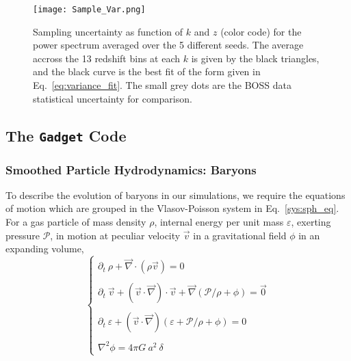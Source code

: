 \begin{figure}
\begin{center}
\texttt{[image: Sample\_Var.png]}
\caption{Sampling uncertainty as function of $k$ and $z$ (color code) for the power spectrum averaged over the 5 different seeds. The average accross the 13 redshift bins at each $k$ is given by the black triangles, and the black curve is the best fit of the form given in Eq.~\ref{eq:variance_fit}. The small grey dots are the BOSS data statistical uncertainty for comparison.}
\label{fig:sampling_variance}
\end{center}
\end{figure}


\subsection{The \texttt{Gadget} Code}

\subsubsection{Smoothed Particle Hydrodynamics: Baryons}
\label{sec:sph}

To describe the evolution of baryons in our simulations, we require the equations of motion which are grouped in the Vlasov-Poisson system in Eq.~\ref{sys:sph_eq}. For a gas particle of mass density $\rho$, internal energy per unit mass $\varepsilon$, exerting pressure $\mathcal{P}$, in motion at peculiar velocity $\vec{v}$ in a gravitational field $\phi$ in an expanding volume, \\

\begin{equation}
\label{sys:sph_eq}
\left\{
\begin{array}{l}
\partial_t ~\rho + \vec{\nabla} \cdot \left( \rho \vec{v} \right) = 0 \\
\\
\partial_t ~\vec{v} + \left( \vec{v} \cdot \vec{\nabla} \right) \cdot \vec{v} + \vec{\nabla} \left( \mathcal{P}/\rho + \phi \right) = \vec{0} \\
\\
\partial_t ~\varepsilon + \left( \vec{v} \cdot \vec{\nabla} \right) \left( \varepsilon + \mathcal{P}/\rho + \phi \right) = 0\\
\\
\nabla^2 \phi = 4 \pi G~ a^2 ~\delta
\end{array}
\right.
\end{equation} \\

